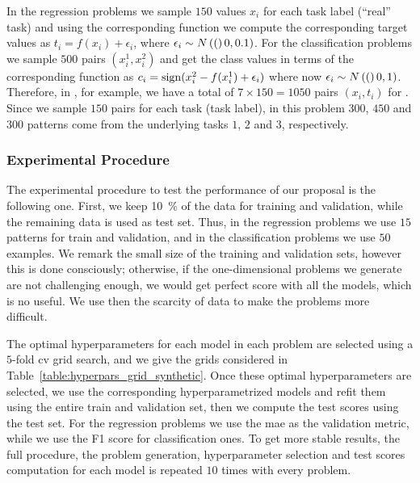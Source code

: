 %
In the regression problems we sample $150$ values $x_i$ for each task label (``real'' task) and using the corresponding function we compute the corresponding target values as $t_i = f(x_i) + \epsilon_i$, where $\epsilon_i \sim N \left((\right)0, 0.1)$.
For the classification problems we sample $500$ pairs $(x_i^1, x_i^2)$ and get the class values in terms of the corresponding function as $c_i = \operatorname{sign}(x_i^2 - f(x_i^1) + \epsilon_i)$ where now $\epsilon_i \sim N \left((\right)0, 1)$.
%
Therefore, in , for example, we have a total of $7 \times 150 = \num{1050}$ pairs $(x_i, t_i)$ for . Since we sample $150$ pairs for each task (task label), in this problem $300$, $450$ and $300$ patterns come from the underlying tasks $1$, $2$ and $3$, respectively.

\subsubsection*{Experimental Procedure}
The experimental procedure to test the performance of our proposal is the following one.
First, we keep \SI{10}{\percent} of the data for training and validation, while the remaining data is used as test set. Thus, in the regression problems we use $15$ patterns for train and validation, and in the classification problems we use $50$ examples.
%
We remark the small size of the training and validation sets, however this is done consciously; otherwise, if the one-dimensional problems we generate are not challenging enough, we would get perfect score with all the models, which is no useful. We use then the scarcity of data to make the problems more difficult.
%

The optimal hyperparameters for each model in each problem are selected using a $5$-fold \acrshort{cv} grid search, and we give the grids considered in Table~\ref{table:hyperpars_grid_synthetic}.
%
Once these optimal hyperparameters are selected, we use the corresponding hyperparametrized models and refit them using the entire train and validation set, then we compute the test scores using the test set.
%
For the regression problems we use the \acrfull{mae} as the validation metric, while we use the F1 score for classification ones.
%
To get more stable results, the full procedure, the problem generation, hyperparameter selection and test scores computation for each model is repeated $10$ times with every problem.
%

